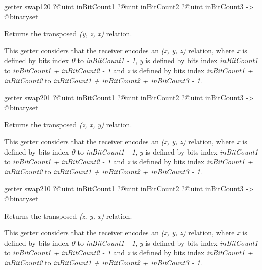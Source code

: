 
\begin{galgas}
getter swap120
  ?@uint inBitCount1
  ?@uint inBitCount2
  ?@uint inBitCount3
  -> @binaryset
\end{galgas}

Returns the transposed \emph{(y, z, x)} relation.

This getter considers that the receiver encodes an \emph{(x, y, z)} relation, where \emph{x} is defined by bits index \emph{0} to \emph{inBitCount1  - 1}, \emph{y} is defined by bits index \emph{inBitCount1} to \emph{inBitCount1 + inBitCount2 - 1} and  \emph{z} is defined by bits index \emph{inBitCount1 + inBitCount2} to \emph{inBitCount1 + inBitCount2 + inBitCount3 - 1}.







\begin{galgas}
getter swap201
  ?@uint inBitCount1
  ?@uint inBitCount2
  ?@uint inBitCount3
  -> @binaryset
\end{galgas}

Returns the transposed \emph{(z, x, y)} relation.

This getter considers that the receiver encodes an \emph{(x, y, z)} relation, where \emph{x} is defined by bits index \emph{0} to \emph{inBitCount1  - 1}, \emph{y} is defined by bits index \emph{inBitCount1} to \emph{inBitCount1 + inBitCount2 - 1} and  \emph{z} is defined by bits index \emph{inBitCount1 + inBitCount2} to \emph{inBitCount1 + inBitCount2 + inBitCount3 - 1}.







\begin{galgas}
getter swap210
  ?@uint inBitCount1
  ?@uint inBitCount2
  ?@uint inBitCount3
  -> @binaryset
\end{galgas}

Returns the transposed \emph{(z, y, x)} relation.

This getter considers that the receiver encodes an \emph{(x, y, z)} relation, where \emph{x} is defined by bits index \emph{0} to \emph{inBitCount1  - 1}, \emph{y} is defined by bits index \emph{inBitCount1} to \emph{inBitCount1 + inBitCount2 - 1} and  \emph{z} is defined by bits index \emph{inBitCount1 + inBitCount2} to \emph{inBitCount1 + inBitCount2 + inBitCount3 - 1}.








